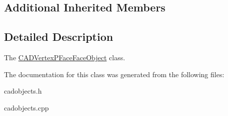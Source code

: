 \subsection*{Additional Inherited Members}


\subsection{Detailed Description}
The \hyperlink{class_c_a_d_vertex_p_face_face_object}{C\+A\+D\+Vertex\+P\+Face\+Face\+Object} class. 

The documentation for this class was generated from the following files\+:\begin{DoxyCompactItemize}
\item 
cadobjects.\+h\item 
cadobjects.\+cpp\end{DoxyCompactItemize}
